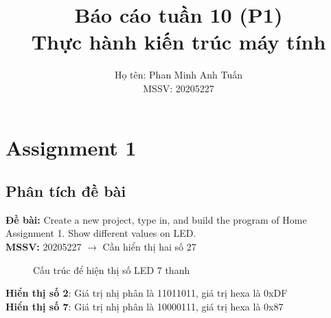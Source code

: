 \documentclass[a4paper,12pt]{article}
\title{\textbf{Báo cáo tuần 10 (P1) \\ Thực hành kiến trúc máy tính}}
\author{Họ tên: Phan Minh Anh Tuấn \\ MSSV: 20205227}
\date{}
\begin{document}
\maketitle
\tableofcontents
\newpage
\section{Assignment 1}
\subsection{Phân tích đề bài}
\textbf{Đề bài: }Create a new project, type in, and build the program of Home Assignment 1. Show different values on LED. \\
\textbf{MSSV: }20205227
$\rightarrow$ Cần hiển thị hai số 27
\FloatBarrier
\begin{figure}[ht!]
	\centerline{}
	\caption{Cấu trúc để hiện thị số LED 7 thanh}
	\label{fig:ass1}
\end{figure}
\noindent
\textbf{Hiển thị số 2}: Giá trị nhị phân là 11011011, giá trị hexa là 0xDF \\
\textbf{Hiển thị số 7}: Giá trị nhị phân là 10000111, giá trị hexa là 0x87 \\
\end{document}
